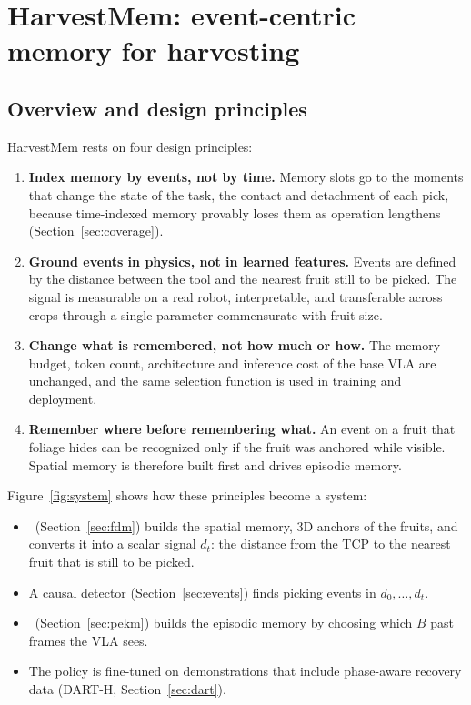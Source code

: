 \section{HarvestMem: event-centric memory for harvesting}
\label{sec:method}

\subsection{Overview and design principles}
\label{sec:principles}
HarvestMem rests on four design principles:
\begin{enumerate}
\item[P1] \textbf{Index memory by events, not by time.} Memory slots go to the moments that change the state of the task, the contact and detachment of each pick, because time-indexed memory provably loses them as operation lengthens (Section~\ref{sec:coverage}).
\item[P2] \textbf{Ground events in physics, not in learned features.} Events are defined by the distance between the tool and the nearest fruit still to be picked. The signal is measurable on a real robot, interpretable, and transferable across crops through a single parameter commensurate with fruit size.
\item[P3] \textbf{Change what is remembered, not how much or how.} The memory budget, token count, architecture and inference cost of the base VLA are unchanged, and the same selection function is used in training and deployment.
\item[P4] \textbf{Remember where before remembering what.} An event on a fruit that foliage hides can be recognized only if the fruit was anchored while visible. Spatial memory is therefore built first and drives episodic memory.
\end{enumerate}
Figure~\ref{fig:system} shows how these principles become a system:
\begin{itemize}
\item \fdm\ (Section~\ref{sec:fdm}) builds the spatial memory, 3D anchors of the fruits, and converts it into a scalar signal $d_t$: the distance from the TCP to the nearest fruit that is still to be picked.
\item A causal detector (Section~\ref{sec:events}) finds picking events in $d_0,\dots,d_t$.
\item \pekm\ (Section~\ref{sec:pekm}) builds the episodic memory by choosing which $B$ past frames the VLA sees.
\item The policy is fine-tuned on demonstrations that include phase-aware recovery data (DART-H, Section~\ref{sec:dart}).
\end{itemize}


